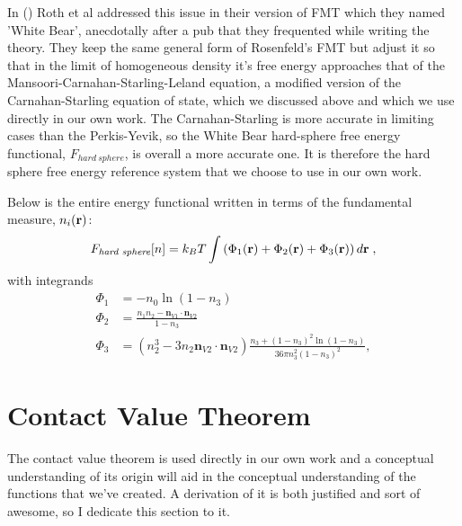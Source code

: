 In () Roth et al addressed this issue in their version of FMT
which they named 'White Bear', anecdotally after a pub that they
frequented while writing the theory.  They keep the same general form
of Rosenfeld's FMT but adjust it so that in the limit of homogeneous
density it's free energy approaches that of the
Mansoori-Carnahan-Starling-Leland equation, a modified version of the
Carnahan-Starling equation of state, which we discussed above and
which we use directly in our own work.  The Carnahan-Starling is more
accurate in limiting cases than the Perkis-Yevik, so the White Bear
hard-sphere free energy functional, $F_{hard~sphere}$, is overall a
more accurate one.  It is therefore the hard sphere free energy
reference system that we choose to use in our own work.

Below is the entire energy functional written in terms of the
fundamental measure, $n_i(\textbf{r})$:
\begin{equation}
F_\textit{hard~sphere}[n] = k_B T \int \left(\Phi_1(\textbf{r}) + \Phi_2(\textbf{r}) + \Phi_3(\textbf{r})\right) d\textbf{r} \; ,
\end{equation}
with integrands
\begin{align}
\Phi_1 &= -n_0 \ln\left( 1 - n_3\right) \label{eq:Phi1}\\
\Phi_2 &= \frac{n_1 n_2 - \mathbf{n}_{V1} \cdot\mathbf{n}_{V2}}{1-n_3} \\
\Phi_3 &= (n_2^3 - 3 n_2 \mathbf{n}_{V2} \cdot \mathbf{n}_{V2}) \frac{
  n_3 + (1-n_3)^2 \ln(1-n_3)
}{
  36\pi n_3^2\left( 1 - n_3 \right)^2
} , \label{eq:Phi3}
\end{align}

\clearpage
\newpage

\section{Contact Value Theorem}
The contact value theorem is used directly in our own work and a
conceptual understanding of its origin will aid in the conceptual
understanding of the functions that we've created.  A derivation of it
is both justified and sort of awesome, so I dedicate this section to
it.

